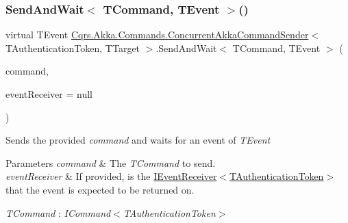 \subsubsection{\texorpdfstring{Send\+And\+Wait$<$ T\+Command, T\+Event $>$()}{SendAndWait< TCommand, TEvent >()}\hspace{0.1cm}{\footnotesize\ttfamily [1/6]}}
{\footnotesize\ttfamily virtual T\+Event \hyperlink{classCqrs_1_1Akka_1_1Commands_1_1ConcurrentAkkaCommandSender}{Cqrs.\+Akka.\+Commands.\+Concurrent\+Akka\+Command\+Sender}$<$ T\+Authentication\+Token, T\+Target $>$.Send\+And\+Wait$<$ T\+Command, T\+Event $>$ (\begin{DoxyParamCaption}\item[{T\+Command}]{command,  }\item[{\hyperlink{interfaceCqrs_1_1Events_1_1IEventReceiver}{I\+Event\+Receiver}$<$ T\+Authentication\+Token $>$}]{event\+Receiver = {\ttfamily null} }\end{DoxyParamCaption})\hspace{0.3cm}{\ttfamily [virtual]}}



Sends the provided {\itshape command}  and waits for an event of {\itshape T\+Event}  


\begin{DoxyParams}{Parameters}
{\em command} & The {\itshape T\+Command}  to send.\\
\hline
{\em event\+Receiver} & If provided, is the \hyperlink{interfaceCqrs_1_1Events_1_1IEventReceiver}{I\+Event\+Receiver$<$\+T\+Authentication\+Token$>$} that the event is expected to be returned on.\\
\hline
\end{DoxyParams}
\begin{Desc}
\item[Type Constraints]\begin{description}
\item[{\em T\+Command} : {\em I\+Command$<$T\+Authentication\+Token$>$}]\end{description}
\end{Desc}
\mbox{\label{classCqrs_1_1Akka_1_1Commands_1_1ConcurrentAkkaCommandSender_a171974eb1ba3eb7be9816bd7927227ac}} 
